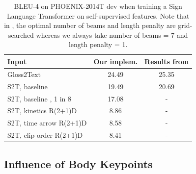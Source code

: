 \documentclass[final]{cvpr}
\begin{document}
\begin{table}[H]
	\centering
	\def\arraystretch{0.9}
	\setlength{\tabcolsep}{0.2em}
	\begin{tabular}{l c c}
		\toprule
		Input   & Our implem.   & Results from \cite{neccam} \\
		\midrule
		Gloss2Text   &  24.49 & 25.35 \\
		S2T, baseline \cite{hmm}   &  19.49 & 20.69  \\
		S2T, baseline \cite{hmm}, 1 in 8   &  17.08  &  -  \\
		S2T, kinetics R(2+1)D &  8.86 &  -  \\
		S2T, time arrow R(2+1)D  &  8.58 & - \\
		S2T, clip order R(2+1)D  &  8.41 & - \\
		\bottomrule
	\end{tabular}
	\vspace{-0.4\baselineskip}
	\caption{BLEU-4 on PHOENIX-2014T dev when training a Sign Language Transformer on self-supervised features. Note that in \cite{neccam}, the optimal number of beams and length penalty are grid-searched whereas we always take number of beams = 7 and length penalty = 1. }
	\label{tab:self-sup}
\end{table}


\subsection{Influence of Body Keypoints}
\end{document}
